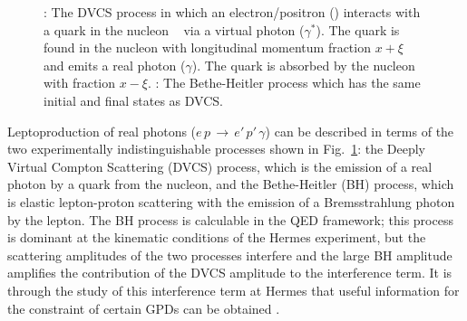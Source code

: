 \begin{figure}
\begin{center}
\hspace{3cm}
\caption[DVCS and Bethe Heitler hand bag diagram.]{: The DVCS process in
which an electron/positron () interacts with a quark in the nucleon \  via a virtual photon ($\gamma^\ast$). The quark is found in the nucleon with longitudinal momentum fraction $x+\xi$ and emits a real photon ($\gamma$). The quark is absorbed by the nucleon with fraction $x-\xi$. : The Bethe-Heitler process which has the same initial and final states as DVCS.}
\label{spin}
\end{center}
\end{figure}

Leptoproduction of real photons ($e\,p\,\rightarrow\,e'\,p'\,\gamma$) can be described in terms of the two experimentally indistinguishable processes shown in Fig.~\ref{spin}: the Deeply Virtual Compton Scattering (DVCS) process, which is the
emission of a real photon by a quark from the nucleon, and the Bethe-Heitler (BH) process, which is elastic lepton-proton scattering with the
emission of a Bremsstrahlung photon by the lepton. 
The BH process is calculable in the QED framework; this process is
dominant at the kinematic conditions of the H{\sc ermes} experiment, but the
scattering amplitudes of the two processes interfere and the large BH amplitude
amplifies the contribution of the DVCS amplitude to the interference term. 
It is through the study of this interference term at H{\sc ermes} that
useful information for the constraint of certain GPDs can be obtained .

